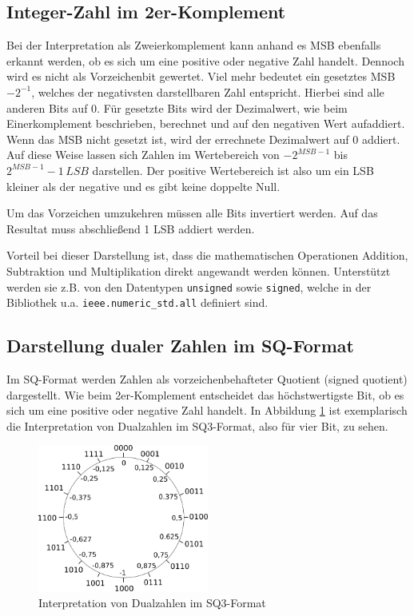 \subsection{Integer-Zahl im 2er-Komplement}\label{sec:Integer2erKomplement}

Bei der Interpretation als Zweierkomplement kann anhand es MSB ebenfalls erkannt werden, ob es sich um eine positive oder negative Zahl handelt. Dennoch wird es nicht
als Vorzeichenbit gewertet. Viel mehr bedeutet ein gesetztes MSB $-2^{-1}$, welches der negativsten darstellbaren Zahl entspricht. Hierbei sind alle anderen 
Bits auf 0. Für gesetzte Bits wird der Dezimalwert, wie beim Einerkomplement beschrieben, berechnet und auf den negativen Wert aufaddiert. Wenn das MSB nicht gesetzt
ist, wird der errechnete Dezimalwert auf 0 addiert. Auf diese Weise lassen sich Zahlen im Wertebereich von $-2^{MSB-1}$ bis $2^{MSB-1}-1 \,LSB$ darstellen. Der positive
Wertebereich ist also um ein LSB kleiner als der negative und es gibt keine doppelte Null.

Um das Vorzeichen umzukehren müssen alle Bits invertiert werden. Auf das Resultat muss abschließend 1 LSB addiert werden.

Vorteil bei dieser Darstellung ist, dass die mathematischen Operationen Addition, Subtraktion und Multiplikation direkt angewandt werden können. Unterstützt werden sie z.B. 
von den Datentypen \texttt{unsigned} sowie \texttt{signed}, welche in der Bibliothek u.a. \texttt{ieee.numeric\_std.all} definiert sind.


\subsection{Darstellung dualer Zahlen im SQ-Format}
Im SQ-Format werden Zahlen als vorzeichenbehafteter Quotient (signed quotient) dargestellt. Wie beim 2er-Komplement entscheidet das höchstwertigste Bit, ob es sich um eine
positive oder negative Zahl handelt. In Abbildung \ref{pic:SQKreis} ist exemplarisch die Interpretation von Dualzahlen im SQ3-Format, also für vier Bit, zu sehen.

\begin{figure}[ht!]
 \centering
 \includegraphics[width=0.5\textwidth]{img/SQ-Kreis.png}
 \caption{Interpretation von Dualzahlen im SQ3-Format}
 \label{pic:SQKreis}
\end{figure}



